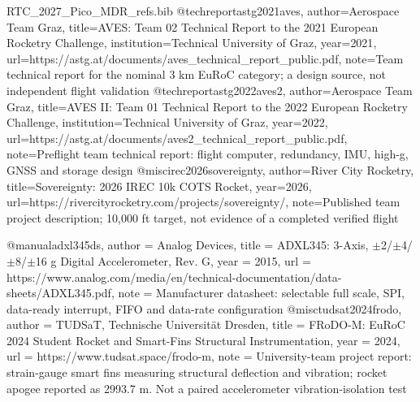 \begin{filecontents*}[overwrite]{RTC_2027_Pico_MDR_refs.bib}
@techreport{astg2021aves,
 author={{Aerospace Team Graz}},
 title={{AVES}: Team 02 Technical Report to the 2021 European Rocketry Challenge},
 institution={Technical University of Graz}, year={2021},
 url={https://astg.at/documents/aves_technical_report_public.pdf},
 note={Team technical report for the nominal 3 km EuRoC category; a design source, not independent flight validation}
}
@techreport{astg2022aves2,
 author={{Aerospace Team Graz}},
 title={{AVES II}: Team 01 Technical Report to the 2022 European Rocketry Challenge},
 institution={Technical University of Graz}, year={2022},
 url={https://astg.at/documents/aves2_technical_report_public.pdf},
 note={Preflight team technical report: flight computer, redundancy, IMU, high-g, GNSS and storage design}
}
@misc{irec2026sovereignty,
 author={{River City Rocketry}},
 title={Sovereignty: 2026 IREC 10k COTS Rocket},
 year={2026},
 url={https://rivercityrocketry.com/projects/sovereignty/},
 note={Published team project description; 10,000 ft target, not evidence of a completed verified flight}
}

@manual{adxl345ds,
  author = {{Analog Devices}},
  title = {{ADXL345}: 3-Axis, $\pm$2/$\pm$4/$\pm$8/$\pm$16 g Digital Accelerometer, Rev. G},
  year = {2015},
  url = {https://www.analog.com/media/en/technical-documentation/data-sheets/ADXL345.pdf},
  note = {Manufacturer datasheet: selectable full scale, SPI, data-ready interrupt, FIFO and data-rate configuration}
}
@misc{tudsat2024frodo,
  author = {{TUDSaT, Technische Universit{\"a}t Dresden}},
  title = {{FRoDO-M}: EuRoC 2024 Student Rocket and Smart-Fins Structural Instrumentation},
  year = {2024},
  url = {https://www.tudsat.space/frodo-m},
  note = {University-team project report: strain-gauge smart fins measuring structural deflection and vibration; rocket apogee reported as 2993.7 m. Not a paired accelerometer vibration-isolation test}
}
\end{filecontents*}

\documentclass[10pt,a4paper]{article}
\usepackage[a4paper,margin=17mm,top=18mm,bottom=18mm]{geometry}
\usepackage[T1]{fontenc}
\usepackage[utf8]{inputenc}
\usepackage{lmodern,microtype}
\usepackage{amssymb}
\usepackage[table]{xcolor}
\usepackage{booktabs,tabularx,longtable,array}
\usepackage{enumitem}
\usepackage{tikz}
\usepackage{pgfplots}
\pgfplotsset{compat=1.18}
\usepackage{pgfgantt}
\usetikzlibrary{arrows.meta,positioning,shapes.geometric,calc,decorations.pathmorphing}
\usepackage{csquotes}
\usepackage[unicode,colorlinks=true,linkcolor=blue!55!black,urlcolor=blue!55!black,citecolor=blue!55!black]{hyperref}
\usepackage[backend=biber,style=ieee,sorting=none,maxnames=5]{biblatex}

\usepackage{fancyhdr,titlesec}
\usepackage{ragged2e}
\usepackage{caption}
\captionsetup{font=small,labelfont=bf}

